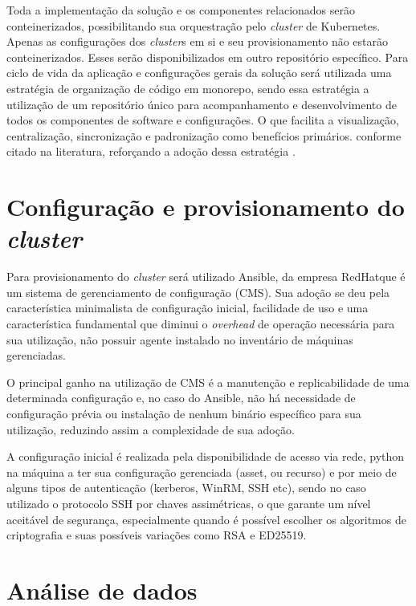 Toda a implementação da solução e os componentes relacionados serão conteinerizados, possibilitando  sua orquestração pelo  \emph{cluster} de Kubernetes\textregistered. Apenas as configurações dos  \emph{cluster}s em si e seu provisionamento não estarão conteinerizados. Esses serão disponibilizados em outro repositório específico. 
Para ciclo de vida da aplicação e configurações gerais da solução será utilizada uma estratégia de organização de código em monorepo, sendo essa estratégia a utilização de um repositório único para acompanhamento e desenvolvimento de todos os componentes de software e configurações. O que facilita a visualização, centralização, sincronização e padronização como benefícios primários. conforme citado na literatura, reforçando a adoção dessa estratégia \cite{brito_monorepos_2018}.


\section{Configuração e provisionamento do  \emph{cluster}}
Para provisionamento do \emph{cluster} será utilizado Ansible\textregistered, da empresa RedHat\textregistered que é  um sistema de gerenciamento de configuração (CMS). Sua adoção se deu pela característica minimalista de configuração inicial, facilidade de uso e uma característica fundamental que diminui o \emph{overhead} de operação necessária para sua utilização, não possuir agente instalado no inventário de máquinas gerenciadas. 

O principal ganho na utilização de CMS é a manutenção e replicabilidade de uma determinada configuração e, no caso do Ansible, não há necessidade de configuração prévia ou instalação de nenhum binário específico para sua utilização, reduzindo assim a complexidade de sua adoção.

A configuração inicial é realizada pela disponibilidade de acesso via rede, python na máquina a ter sua configuração gerenciada (asset, ou recurso) e por meio de alguns tipos de autenticação (kerberos, WinRM, SSH etc), sendo no caso utilizado o protocolo SSH \cite{noauthor_rfc4254_nodate} por chaves assimétricas, o que garante um nível aceitável de segurança, especialmente quando é possível escolher os algoritmos de criptografia e suas possíveis variações como RSA e ED25519.

\section{Análise de dados}


